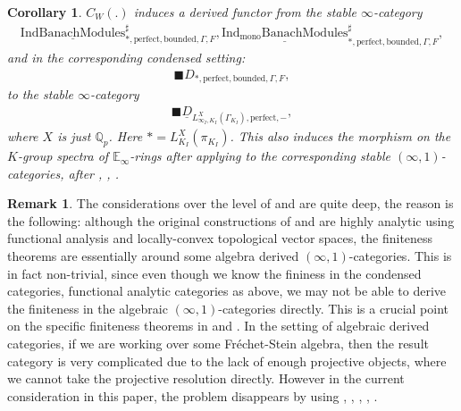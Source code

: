 \documentclass[12pt]{article}
\newtheorem{corollary}{Corollary}
\theoremstyle{definition}
\newtheorem{remark}{Remark}
\begin{document}
\begin{corollary}
$C_{W}(.)$ induces a derived functor from the stable $\infty$-category 
\begin{align}
\underline{\mathrm{IndBanachModules}}^\sharp_{*,\mathrm{perfect},\mathrm{bounded},\Gamma,F}, \underline{\mathrm{Ind_{\mathrm{mono}}BanachModules}}^\sharp_{*,\mathrm{perfect},\mathrm{bounded},\Gamma,F},
\end{align}
and in the corresponding condensed setting:
\begin{align}
\blacksquare D_{*,\mathrm{perfect},\mathrm{bounded},\Gamma,F},
\end{align}
to the stable $\infty$-category 
\begin{align}
\blacksquare\underline{D}_{L^X_{\infty_I,K_I}(\Gamma_{K_I}),\mathrm{perfect},-},
\end{align}
where $X$ is just $\mathbb{Q}_p$. Here $*=L_{K_I}^X(\pi_{K_I})$. This also induces the morphism on the $K$-group spectra of $\mathbb{E}_\infty$-rings after applying \cite{BGT} to the corresponding stable $(\infty,1)$-categories, after \cite{G2}, \cite{A2}, \cite{BGT}.
\end{corollary}


\begin{remark}
The considerations over the level of \cite{T} and \cite{KPX} are quite deep, the reason is the following: although the original constructions of \cite{T} and \cite{KPX} are highly analytic using functional analysis and locally-convex topological vector spaces, the finiteness theorems are essentially around some algebra derived $(\infty,1)$-categories. This is in fact non-trivial, since even though we know the fininess in the condensed categories, functional analytic categories as above, we may not be able to derive the finiteness in the algebraic $(\infty,1)$-categories directly. This is a crucial point on the specific finiteness theorems in \cite{T} and \cite{KPX}. In the setting of algebraic derived categories, if we are working over some Fr\'echet-Stein algebra, then the result category is very complicated due to the lack of enough projective objects, where we cannot take the projective resolution directly. However in the current consideration in this paper, the problem disappears by using \cite{BBBK}, \cite{BBKK}, \cite{CS1}, \cite{CS2} , \cite{CS3}.
\end{remark}
\end{document}
